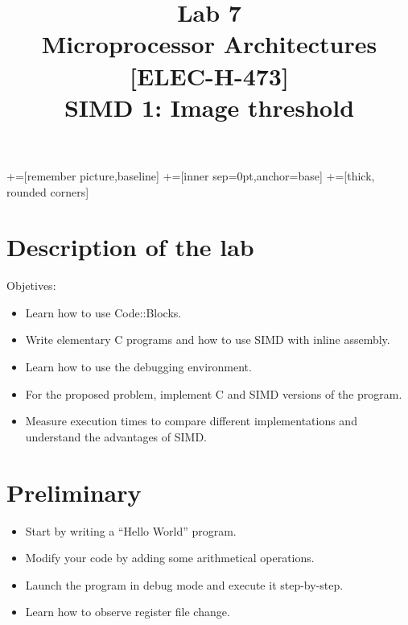 \documentclass[10pt,a4paper]{article}
\date{\vspace{-1cm}\version}
\title{\vspace{-2cm} Lab 7\\ Microprocessor Architectures [ELEC-H-473]\\ SIMD 1: Image threshold\ifthenelse{\boolean{corrige}}{~\\Corrigé}{}}
\theoremstyle{definition}%
\begin{document}
\newcommand\tabnode[1]{\addtocounter{nodecount}{1} \tikz \node (\arabic{nodecount}) {#1};}

+=[remember picture,baseline]
+=[inner sep=0pt,anchor=base]
+=[thick, rounded corners]



\maketitle
\section*{Description of the lab}
Objetives:
\begin{itemize}
	\item Learn how to use Code::Blocks.
	\item Write	elementary C programs and how to use SIMD with inline assembly.
	\item Learn how to use the debugging environment.
	\item For the proposed problem, implement C and SIMD versions of the program.
	\item Measure execution times to compare different implementations and understand the advantages of SIMD.
\end{itemize}

\section*{Preliminary}
\begin{itemize}
	\item Start by writing a ``Hello World'' program.
	\item Modify your code by adding some arithmetical operations.
	\item Launch the program in debug mode and execute it step-by-step.
	\item Learn how to observe register file change.
\end{itemize}
\end{document}
